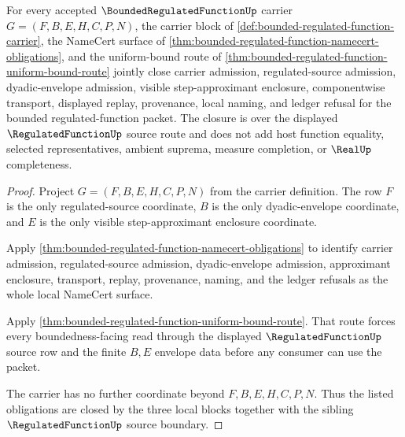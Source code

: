 \begin{theorem}
\label{thm:bounded-regulated-function-obligation-closure}
For every accepted $\BoundedRegulatedFunctionUp$ carrier $G=(F,B,E,H,C,P,N)$, the carrier block of \autoref{def:bounded-regulated-function-carrier}, the NameCert surface of \autoref{thm:bounded-regulated-function-namecert-obligations}, and the uniform-bound route of \autoref{thm:bounded-regulated-function-uniform-bound-route} jointly close carrier admission, regulated-source admission, dyadic-envelope admission, visible step-approximant enclosure, componentwise transport, displayed replay, provenance, local naming, and ledger refusal for the bounded regulated-function packet. The closure is over the displayed $\RegulatedFunctionUp$ source route and does not add host function equality, selected representatives, ambient suprema, measure completion, or $\RealUp$ completeness.
\end{theorem}
\begin{proof}
Project $G=(F,B,E,H,C,P,N)$ from the carrier definition. The row $F$ is the only regulated-source coordinate, $B$ is the only dyadic-envelope coordinate, and $E$ is the only visible step-approximant enclosure coordinate.

Apply \autoref{thm:bounded-regulated-function-namecert-obligations} to identify carrier admission, regulated-source admission, dyadic-envelope admission, approximant enclosure, transport, replay, provenance, naming, and the ledger refusals as the whole local NameCert surface.

Apply \autoref{thm:bounded-regulated-function-uniform-bound-route}. That route forces every boundedness-facing read through the displayed $\RegulatedFunctionUp$ source row and the finite $B,E$ envelope data before any consumer can use the packet.

The carrier has no further coordinate beyond $F,B,E,H,C,P,N$. Thus the listed obligations are closed by the three local blocks together with the sibling $\RegulatedFunctionUp$ source boundary.
\end{proof}



